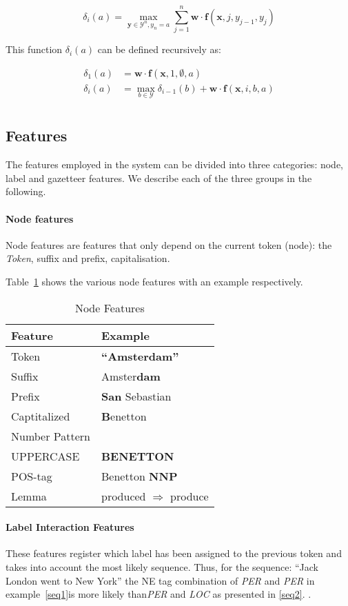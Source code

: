 \documentclass[11pt]{article}
\begin{document}
\[
\delta_i(a) = \max_{\mathbf{y} \in \mathcal{Y}^{n}, y_n = a} \sum_{j=1}^{n}{\mathbf{w} \cdot \boldsymbol{f}(\mathbf{x}, j, y_{j-1}, y_{j})}
\]

\noindent This function $\delta_i(a)$ can be defined recursively as:

\begin{align*}
\delta_1(a) &= \mathbf{w} \cdot \boldsymbol{f}(\mathbf{x}, 1, \emptyset, a) \\
\delta_i(a) &= \max_{b \in \mathcal{Y}} \delta_{i-1}(b) + \mathbf{w} \cdot \boldsymbol{f}(\mathbf{x}, i, b, a) \\
\end{align*}


\subsection{Features}
The features employed in the system can be divided into three categories: node, label and gazetteer features. 
We describe each of the three groups in the following.

\paragraph*{Node features}
Node features are features that only depend on the current token (node): the \emph{Token}, suffix and prefix, capitalisation.

Table~\ref{table:node} shows the various node features with an example respectively.

\begin{table}[h!]
\begin{tabular}{| l | l |}
\hline
\bf Feature & \bf Example \\
\hline
Token &  \textbf{``Amsterdam''}\\
Suffix& Amster\textbf{dam}\\
Prefix&  \textbf{San} Sebastian\\
Captitalized& \textbf{B}enetton\\
Number Pattern & \\
UPPERCASE &  \textbf{BENETTON}\\
POS-tag &  Benetton \textbf{NNP}   \\
Lemma &  produced $\Rightarrow$ produce \\
\hline
\end{tabular}
\caption{Node Features}
\label{table:node}
\end{table}

\paragraph*{Label Interaction Features}
These features register which label has been assigned to the previous token and takes into account the most likely sequence. 
Thus, for the sequence: ``Jack London went to New York'' the NE tag combination of \emph{PER} and \emph{PER} in example~\ref{seq1}is more likely 
than\emph{PER} and \emph{LOC} as presented in \ref{seq2}.
.
\end{document}
